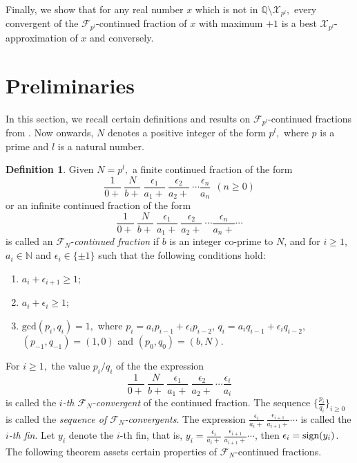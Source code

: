 \documentclass[12pt]{elsarticle}
\theoremstyle{definition}
\newtheorem{defi}{Definition}
\newcommand{\field}[1]{\mathbb{#1}}          \newcommand{\Q}{\field{Q}}
\newcommand{\N}{\field{N}}
\newcommand{\mF}{{\mathcal F}}
\newcommand{\mX}{{\mathcal X}}
\newcommand{\f}{{\mathcal F}}
\newcommand{\ep}{\epsilon}
\newcommand{\sign}{\textnormal{sign}}
\begin{document}
	Finally, we show that for any real number $x$ which is not in $\Q\setminus\mX_{p^l},$ every convergent of the $\f_{p^l}$-continued fraction of $x$ with maximum $+1$ is a best $\mX_{p^l}$-approximation of $x$  and conversely. 
	
	\section{Preliminaries}

In this section, we recall certain definitions and results on $\f_{p^l}$-continued fractions from \cite{seemafnpart1}. Now onwards, $N$ denotes a positive integer of the form $p^l,$ where $p$ is a prime and $l$ is a natural number.
\begin{defi}
Given $N=p^l,$	a finite continued fraction of the form $$\frac{1}{0+}~\frac{N}{b+}~\frac{\epsilon_{1} }{a_{1}+}~\frac{\epsilon_{2}}{a_{2}+}~\cdots\frac{\epsilon_{n}}{a_{n}}~~(n\ge 0)$$
	or
	an infinite continued fraction of the form
	$$\frac{1}{0+}~\frac{N}{b+}~\frac{\epsilon_{1} }{a_{1}+}~\frac{\epsilon_{2}}{a_{2}+}~\cdots\frac{\epsilon_{n}}{a_{n}+}\cdots$$ 
	is called an $\mF_{N}$-{\it continued fraction} if $b$ is an integer co-prime to $N$, and for $i\ge1$, $a_i\in\N$ and $\ep_i\in\{\pm 1\}$ such that the following conditions hold:
	\begin{enumerate}
		\item $a_i+\ep_{i+1}\ge1$;
		\item $a_i+\ep_i\ge1$;
		\item $\mathrm{gcd}(p_i,q_i)=1,$ where $p_i=a_i p_{i-1}+\ep_i p_{i-2}$, $q_i=a_i q_{i-1}+\ep_i q_{i-2}$, $(p_{-1},q_{-1})=(1,0)$ and $(p_0,q_0)=(b,N)$. 
	\end{enumerate}  
\end{defi} 
	For $i\ge1,$ the value $p_i/q_i$ of the the expression
	$$\frac{1}{0+}~\frac{N}{b+}~\frac{\epsilon_{1} }{a_{1}+}~\frac{\epsilon_{2}}{a_{2}+}~\cdots\frac{\epsilon_{i}}{a_{i}}$$
	is called the {\it $i$-th $\f_N$-convergent} of the continued fraction. The sequence $\{\frac{p_i}{q_i}\}_{i\ge0}$ is called the {\it sequence of $\f_N$-convergents}. The expression 
	$\frac{\epsilon_{i}}{a_{i}+}~\frac{\epsilon_{i+1}}{a_{i+1}+}\cdots $ is called the {\it $i$-th fin}. Let $y_i$ denote the $i$-th fin, that is,  $y_i=\frac{\epsilon_{i}}{a_{i}+}~\frac{\epsilon_{i+1}}{a_{i+1}+}\cdots $, then $\ep_{i}=\sign(y_{i})$.
	 The following theorem assets certain properties of $\f_N$-continued fractions. 
\end{document}
